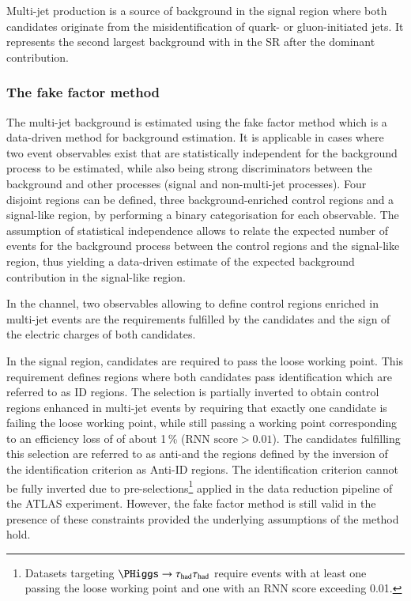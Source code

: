 \label{sec:hadhad_multijet}

Multi-jet production is a source of background in the \hadhad signal
region where both \tauhadvis candidates originate from the
misidentification of quark- or gluon-initiated jets. It represents the
second largest background with \faketauhadvis in the \hadhad SR after
the dominant \ttbarFakes contribution.

\subsubsection{The fake factor method}

The multi-jet background is estimated using the fake factor method
which is a data-driven method for background estimation. It is
applicable in cases where two event observables exist that are
statistically independent for the background process to be estimated,
while also being strong discriminators between the background and
other processes (signal and non-multi-jet processes). Four disjoint
regions can be defined, three background-enriched control regions and
a signal-like region, by performing a binary categorisation for each
observable. The assumption of statistical independence allows to
relate the expected number of events for the background process
between the control regions and the signal-like region, thus yielding
a data-driven estimate of the expected background contribution in the
signal-like region.

In the \hadhad channel, two observables allowing to define control
regions enriched in multi-jet events are the \tauid requirements
fulfilled by the \tauhadvis candidates and the sign of the electric
charges of both candidates.

In the signal region, \tauhadvis candidates are required to pass the
loose \tauid working point. This requirement defines regions where
both \tauhadvis candidates pass identification which are referred to
as ID regions. The selection is partially inverted to obtain control
regions enhanced in multi-jet events by requiring that exactly one
\tauhadvis candidate is failing the loose \tauid working point, while
still passing a working point corresponding to an efficiency loss of
\tauhad of about 1\,\% ($\text{RNN score} > 0.01$). The \tauhadvis
candidates fulfilling this selection are referred to as
anti-\tauhadvis and the regions defined by the inversion of the
identification criterion as Anti-ID regions. The identification
criterion cannot be fully inverted due to
pre-selections\footnote{Datasets targeting $\PHiggs \to \hadhad$
  require events with at least one \tauhadvis passing the loose \tauid
  working point and one \tauhadvis with an RNN \tauid score exceeding
  0.01.} applied in the data reduction pipeline of the ATLAS
experiment. However, the fake factor method is still valid in the
presence of these constraints provided the underlying assumptions of
the method hold.

